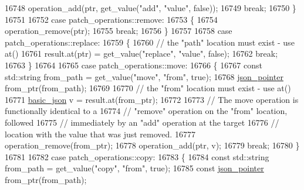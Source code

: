 \begin{DoxyCode}
16748                     operation\_add(ptr, get\_value(\textcolor{stringliteral}{"add"}, \textcolor{stringliteral}{"value"}, \textcolor{keyword}{false}));
16749                     \textcolor{keywordflow}{break};
16750                 \}
16751 
16752                 \textcolor{keywordflow}{case} patch\_operations::remove:
16753                 \{
16754                     operation\_remove(ptr);
16755                     \textcolor{keywordflow}{break};
16756                 \}
16757 
16758                 \textcolor{keywordflow}{case} patch\_operations::replace:
16759                 \{
16760                     \textcolor{comment}{// the "path" location must exist - use at()}
16761                     result.at(ptr) = get\_value(\textcolor{stringliteral}{"replace"}, \textcolor{stringliteral}{"value"}, \textcolor{keyword}{false});
16762                     \textcolor{keywordflow}{break};
16763                 \}
16764 
16765                 \textcolor{keywordflow}{case} patch\_operations::move:
16766                 \{
16767                     \textcolor{keyword}{const} std::string from\_path = get\_value(\textcolor{stringliteral}{"move"}, \textcolor{stringliteral}{"from"}, \textcolor{keyword}{true});
16768                     \hyperlink{classnlohmann_1_1basic__json_a6886a5001f5b449ad316101a311ce536}{json\_pointer} from\_ptr(from\_path);
16769 
16770                     \textcolor{comment}{// the "from" location must exist - use at()}
16771                     \hyperlink{classnlohmann_1_1basic__json_aed115142bd0c6c66c864700e0467df55}{basic\_json} v = result.at(from\_ptr);
16772 
16773                     \textcolor{comment}{// The move operation is functionally identical to a}
16774                     \textcolor{comment}{// "remove" operation on the "from" location, followed}
16775                     \textcolor{comment}{// immediately by an "add" operation at the target}
16776                     \textcolor{comment}{// location with the value that was just removed.}
16777                     operation\_remove(from\_ptr);
16778                     operation\_add(ptr, v);
16779                     \textcolor{keywordflow}{break};
16780                 \}
16781 
16782                 \textcolor{keywordflow}{case} patch\_operations::copy:
16783                 \{
16784                     \textcolor{keyword}{const} std::string from\_path = get\_value(\textcolor{stringliteral}{"copy"}, \textcolor{stringliteral}{"from"}, \textcolor{keyword}{true});
16785                     \textcolor{keyword}{const} \hyperlink{classnlohmann_1_1basic__json_a6886a5001f5b449ad316101a311ce536}{json\_pointer} from\_ptr(from\_path);

\end{DoxyCode}
